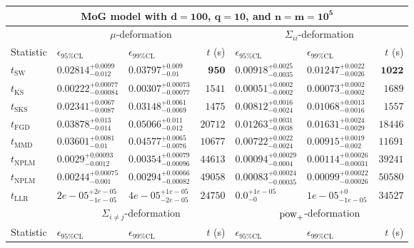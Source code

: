 \begin{tabular}{l|llr|llr}
	\toprule
	\multicolumn{7}{c}{{\bf MoG model with $\mathbf{d=100}$, $\mathbf{q=10}$, and $\mathbf{n=m=10^{5}}$}} \\
	\toprule
	\multicolumn{1}{c}{} & \multicolumn{3}{c}{$\mu$-deformation} & \multicolumn{3}{c}{$\Sigma_{ii}$-deformation} \\
	Statistic & $\epsilon_{95\%\mathrm{CL}}$ & $\epsilon_{99\%\mathrm{CL}}$ & $t$ (s) & $\epsilon_{95\%\mathrm{CL}}$ & $\epsilon_{99\%\mathrm{CL}}$ & $t$ (s) \\
	\midrule
	$t_{\mathrm{SW}}$ & $0.02814_{-0.012}^{+0.0099}$ & $0.03797_{-0.01}^{+0.009}$ & ${\mathbf{950}}$ & $0.00918_{-0.0035}^{+0.0025}$ & $0.01247_{-0.0026}^{+0.0022}$ & ${\mathbf{1022}}$ \\
	$t_{\overline{\mathrm{KS}}}$ & ${\mathbf{0.00222_{-0.00084}^{+0.00077}}}$ & ${\mathbf{0.00307_{-0.00077}^{+0.00073}}}$ & $1541$ & ${\mathbf{0.00051_{-0.0002}^{+0.0002}}}$ & ${\mathbf{0.00073_{-0.0002}^{+0.0002}}}$ & $1689$ \\
	$t_{\mathrm{SKS}}$ & $0.02341_{-0.0087}^{+0.0067}$ & $0.03148_{-0.0069}^{+0.0061}$ & $1475$ & $0.00812_{-0.0024}^{+0.0016}$ & $0.01068_{-0.0016}^{+0.0013}$ & $1557$ \\
	$t_{\mathrm{FGD}}$ & $0.03878_{-0.014}^{+0.013}$ & $0.05066_{-0.012}^{+0.011}$ & $20712$ & $0.01263_{-0.0038}^{+0.0031}$ & $0.01631_{-0.0029}^{+0.0024}$ & $18446$ \\
	$t_{\mathrm{MMD}}$ & $0.03601_{-0.01}^{+0.0081}$ & $0.04577_{-0.0076}^{+0.0065}$ & $10677$ & $0.00722_{-0.0024}^{+0.0022}$ & $0.00915_{-0.002}^{+0.0019}$ & $11691$ \\
\rowcolor{red!35}	$t_{\mathrm{NPLM}}$ & $0.0029_{-0.0012}^{+0.00093}$ & $0.00354_{-0.00096}^{+0.00079}$ & $44613$ & $0.00094_{-0.0004}^{+0.00029}$ & $0.00114_{-0.00031}^{+0.00026}$ & $39241$ \\
\rowcolor{blue!35}	$t_{\mathrm{NPLM}}$ & $0.00244_{-0.001}^{+0.00075}$ & $0.00294_{-0.00082}^{+0.00066}$ & $49058$ & $0.00083_{-0.00035}^{+0.00024}$ & $0.00099_{-0.00026}^{+0.00022}$ & $50580$ \\
	$t_{\mathrm{LLR}}$ & $2e-05_{-1e-05}^{+2e-05}$ & $4e-05_{-2e-05}^{+1e-05}$ & $24750$ & $0.0_{-0}^{+1e-05}$ & $1e-05_{-1e-05}^{+0}$ & $34527$ \\
	\toprule
	\multicolumn{1}{c}{} & \multicolumn{3}{c}{$\Sigma_{i\neq j}$-deformation} & \multicolumn{3}{c}{$\rm{pow}_{+}$-deformation} \\
	Statistic & $\epsilon_{95\%\mathrm{CL}}$ & $\epsilon_{99\%\mathrm{CL}}$ & $t$ (s) & $\epsilon_{95\%\mathrm{CL}}$ & $\epsilon_{99\%\mathrm{CL}}$ & $t$ (s) \\

\end{tabular}
